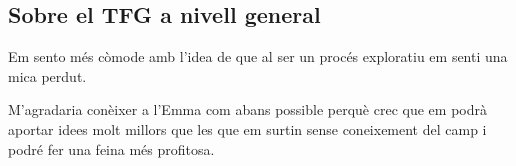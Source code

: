 \documentclass[11pt,a4paper]{article}
\begin{document}
\subsection*{Sobre el TFG a nivell general}
Em sento més còmode amb l'idea de que al ser un procés exploratiu em senti una mica perdut.

M'agradaria conèixer a l'Emma com abans possible perquè crec que em podrà aportar idees molt millors que les que em surtin sense coneixement del camp i podré fer una feina més profitosa.
\end{document}
